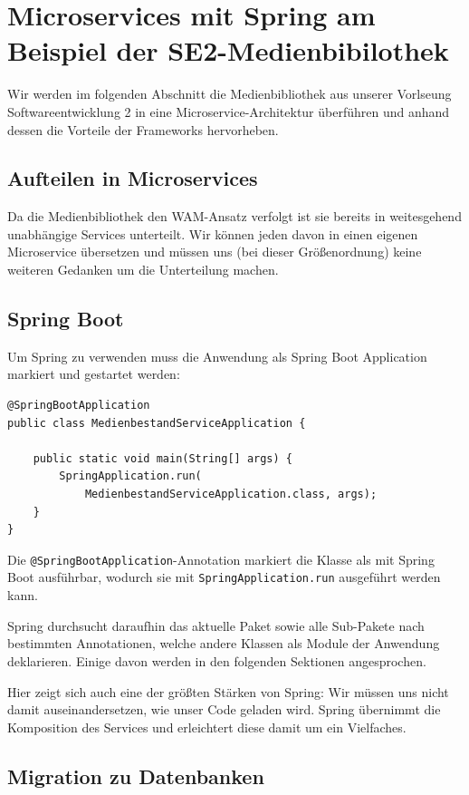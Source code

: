 \documentclass{article}
\begin{document}
\section{Microservices mit Spring am Beispiel der SE2-Medienbibilothek}

Wir werden im folgenden Abschnitt die Medienbibliothek aus unserer Vorlseung Softwareentwicklung 2 in eine Microservice-Architektur überführen und anhand dessen die Vorteile der Frameworks hervorheben.

\subsection{Aufteilen in Microservices}

Da die Medienbibliothek den WAM-Ansatz verfolgt ist sie bereits in weitesgehend unabhängige Services unterteilt.
Wir können jeden davon in einen eigenen Microservice übersetzen und müssen uns (bei dieser Größenordnung) keine weiteren Gedanken um die Unterteilung machen.

\subsection{Spring Boot}

Um Spring zu verwenden muss die Anwendung als Spring Boot Application markiert und gestartet werden:

\begin{lstlisting}
@SpringBootApplication
public class MedienbestandServiceApplication {

    public static void main(String[] args) {
        SpringApplication.run(
        	MedienbestandServiceApplication.class, args);
    }
}
\end{lstlisting}

Die \texttt{@SpringBootApplication}-Annotation markiert die Klasse als mit Spring Boot ausführbar, wodurch sie mit \texttt{SpringApplication.run} ausgeführt werden kann.

Spring durchsucht daraufhin das aktuelle Paket sowie alle Sub-Pakete nach bestimmten Annotationen, welche andere Klassen als Module der Anwendung deklarieren.
Einige davon werden in den folgenden Sektionen angesprochen.

Hier zeigt sich auch eine der größten Stärken von Spring: Wir müssen uns nicht damit auseinandersetzen, wie unser Code geladen wird.
Spring übernimmt die Komposition des Services und erleichtert diese damit um ein Vielfaches.

\subsection{Migration zu Datenbanken}
\end{document}
